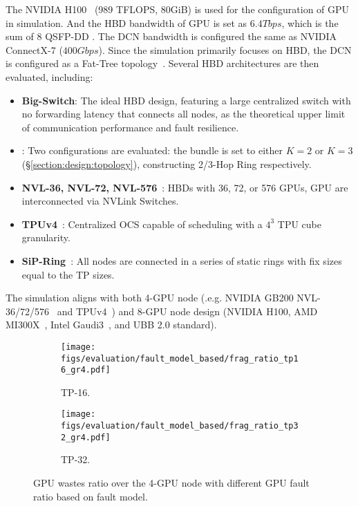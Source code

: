 The NVIDIA H100~\cite{h100} (989 TFLOPS, 80GiB) is used for the configuration of GPU in simulation. And the HBD bandwidth of GPU is set as $6.4Tbps$, which is the sum of 8 QSFP-DD \ocstrx. The DCN bandwidth is configured the same as NVIDIA ConnectX-7 ($400Gbps$). 
Since the simulation primarily focuses on HBD, the DCN is configured as a Fat-Tree topology~\cite{sigcomm2008fattree}. Several HBD architectures are then evaluated, including:

\begin{itemize}[itemsep=2pt,topsep=0pt,parsep=0pt, leftmargin=2ex]
    \item \textbf{Big-Switch}: The ideal HBD design, featuring a large centralized switch with no forwarding latency that connects all nodes, as the theoretical upper limit of communication performance and fault resilience.
    \item \textbf{\sys{}}: Two configurations are evaluated: the \ocstrx{} bundle is set to either $K = 2$ or $K = 3$ (\S\ref{section:design:topology}), constructing 2/3-Hop Ring respectively.
    \item \textbf{NVL-36, NVL-72, NVL-576}~\cite{nvl72}: HBDs with 36, 72, or 576 GPUs, GPU are interconnected via NVLink Switches.
    \item \textbf{TPUv4}~\cite{isca2023tpu}: Centralized OCS capable of scheduling with a $4^3$ TPU cube granularity.
    \item \textbf{SiP-Ring}~\cite{sip-ml}: All nodes are connected in a series of static rings with fix sizes equal to the TP sizes.
\end{itemize}


The simulation aligns with both  4-GPU node (.e.g. NVIDIA GB200 NVL-36/72/576~\cite{nvl72} and TPUv4~\cite{isca2023tpu}) and 8-GPU node design  (NVIDIA H100, AMD MI300X~\cite{amdmi300}, Intel Gaudi3~\cite{intelgaudi3}, and UBB 2.0 standard\cite{UBB2.0}). 


\begin{figure}[h!t]
\vspace{-1em}
    \centering
    \begin{subfigure}[b]{0.23\textwidth}
        \centering
        \texttt{[image: figs/evaluation/fault\_model\_based/frag\_ratio\_tp16\_gr4.pdf]}
        \caption{TP-16.}
        \label{fig:simulation:model:wasted-overview:tp16}
    \end{subfigure}
    \hspace{2pt}
    \begin{subfigure}[b]{0.23\textwidth}
        \centering
        \texttt{[image: figs/evaluation/fault\_model\_based/frag\_ratio\_tp32\_gr4.pdf]}
        \caption{TP-32.}
        \label{fig:simulation:model:wasted-overview:tp32}
    \end{subfigure}
    \vspace{-2em}
    
    \caption{GPU wastes ratio over the 4-GPU node with different GPU fault ratio based on fault model.}
    \vspace{-1em}
    \label{fig:simulation:model:wasted-overview}
\end{figure}


